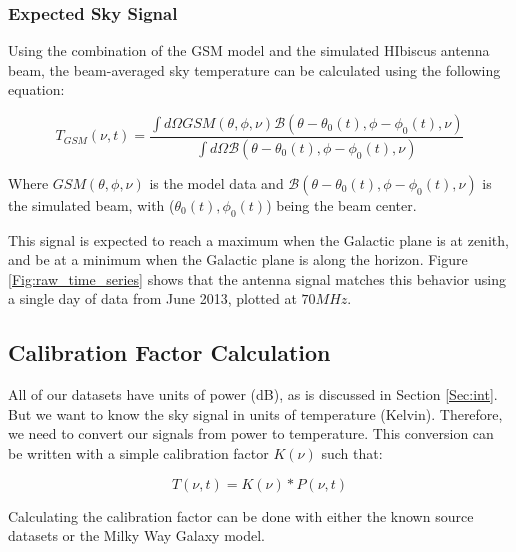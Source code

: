 \subsubsection{Expected Sky Signal}

Using the combination of the GSM model and the simulated HIbiscus antenna beam, the beam-averaged sky temperature can be calculated using the following equation: 

\begin{equation}
T_{GSM} (\nu,t) = \frac{ \int d \Omega GSM (\theta, \phi, \nu) \mathcal{B} (\theta - \theta_0(t), \phi - \phi_0(t),\nu)}{\int d\Omega \mathcal{B} (\theta -\theta_0(t), \phi - \phi_0(t), \nu)}
\end{equation}

Where $GSM (\theta, \phi, \nu)$ is the model data and $\mathcal{B} (\theta - \theta_0(t), \phi - \phi_0(t),\nu)$ is the simulated beam, with ($\theta_0 (t),\phi_0 (t)$) being the beam center. 

This signal is expected to reach a maximum when the Galactic plane is at zenith, and be at a minimum when the Galactic plane is along the horizon. Figure \ref{Fig:raw_time_series} shows that the antenna signal matches this behavior using a single day of data from June 2013, plotted at $70 MHz$. 


\subsection{Calibration Factor Calculation}

All of our datasets have units of power (dB), as is discussed in Section \ref{Sec:int}. But we want to know the sky signal in units of temperature (Kelvin). Therefore, we need to convert our signals from power to temperature. This conversion can be written with a simple calibration factor $K(\nu)$ such that:

\begin{equation}
T(\nu,t) = K(\nu)*P(\nu,t)
\end{equation}

Calculating the calibration factor can be done with either the known source datasets or the Milky Way Galaxy model. 

